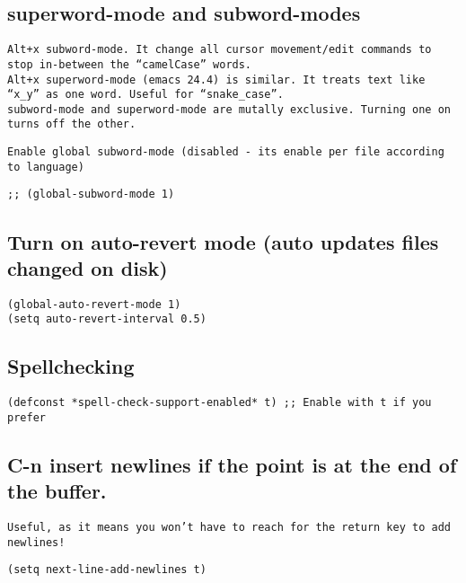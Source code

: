 \documentclass[11pt]{article}
\begin{document}
\subsection*{superword-mode and subword-modes}
\label{sec:org2f8ef3e}
\begin{verbatim}
Alt+x subword-mode. It change all cursor movement/edit commands to stop in-between the “camelCase” words.
Alt+x superword-mode (emacs 24.4) is similar. It treats text like “x_y” as one word. Useful for “snake_case”.
subword-mode and superword-mode are mutally exclusive. Turning one on turns off the other.
\end{verbatim}


\begin{verbatim}
Enable global subword-mode (disabled - its enable per file according to language)
\end{verbatim}


\begin{verbatim}
;; (global-subword-mode 1)
\end{verbatim}

\subsection*{Turn on auto-revert mode (auto updates files changed on disk)}
\label{sec:org58ab644}
\begin{verbatim}
(global-auto-revert-mode 1)
(setq auto-revert-interval 0.5)
\end{verbatim}

\subsection*{Spellchecking}
\label{sec:org1d2991b}
\begin{verbatim}
(defconst *spell-check-support-enabled* t) ;; Enable with t if you prefer
\end{verbatim}

\subsection*{C-n insert newlines if the point is at the end of the buffer.}
\label{sec:org137ad7f}
\begin{verbatim}
Useful, as it means you won’t have to reach for the return key to add newlines!
\end{verbatim}

\begin{verbatim}
(setq next-line-add-newlines t)
\end{verbatim}
\end{document}
